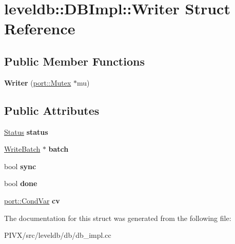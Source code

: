\hypertarget{structleveldb_1_1_d_b_impl_1_1_writer}{}\section{leveldb\+:\+:D\+B\+Impl\+:\+:Writer Struct Reference}
\label{structleveldb_1_1_d_b_impl_1_1_writer}
\subsection*{Public Member Functions}
\begin{DoxyCompactItemize}
\item 
\mbox{\label{structleveldb_1_1_d_b_impl_1_1_writer_a7dfb43a804e1ded7a2a85b3bc756ea93}} 
{\bfseries Writer} (\mbox{\hyperlink{classleveldb_1_1port_1_1_mutex}{port\+::\+Mutex}} $\ast$mu)
\end{DoxyCompactItemize}
\subsection*{Public Attributes}
\begin{DoxyCompactItemize}
\item 
\mbox{\label{structleveldb_1_1_d_b_impl_1_1_writer_af3b0436a99d2679c0e0ac9f6e1fefa37}} 
\mbox{\hyperlink{classleveldb_1_1_status}{Status}} {\bfseries status}
\item 
\mbox{\label{structleveldb_1_1_d_b_impl_1_1_writer_ada051134318411635892f0a7d17cb7c0}} 
\mbox{\hyperlink{classleveldb_1_1_write_batch}{Write\+Batch}} $\ast$ {\bfseries batch}
\item 
\mbox{\label{structleveldb_1_1_d_b_impl_1_1_writer_acb39717e1fa61127f262b474e18ec9f6}} 
bool {\bfseries sync}
\item 
\mbox{\label{structleveldb_1_1_d_b_impl_1_1_writer_afc6025afd873f82252cb563687bd3106}} 
bool {\bfseries done}
\item 
\mbox{\label{structleveldb_1_1_d_b_impl_1_1_writer_aacb835eedc44855a7c223fca024c5ac4}} 
\mbox{\hyperlink{classleveldb_1_1port_1_1_cond_var}{port\+::\+Cond\+Var}} {\bfseries cv}
\end{DoxyCompactItemize}


The documentation for this struct was generated from the following file\+:\begin{DoxyCompactItemize}
\item 
P\+I\+V\+X/src/leveldb/db/db\+\_\+impl.\+cc\end{DoxyCompactItemize}

